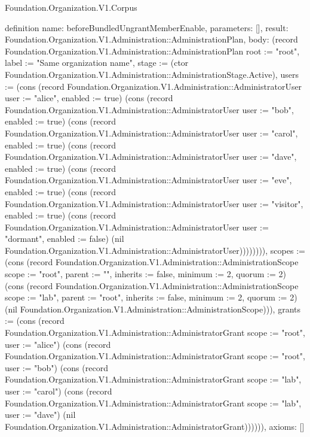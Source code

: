 \begin{lexlean}{Foundation.Organization.V1.Corpus}
\begin{semanticmodule}
definition{
  name: beforeBundledUngrantMemberEnable,
  parameters: [],
  result: Foundation.Organization.V1.Administration::AdministrationPlan,
  body: (record Foundation.Organization.V1.Administration::AdministrationPlan {root := "root", label := "Same organization name", stage := (ctor Foundation.Organization.V1.Administration::AdministrationStage.Active), users := (cons (record Foundation.Organization.V1.Administration::AdministratorUser {user := "alice", enabled := true}) (cons (record Foundation.Organization.V1.Administration::AdministratorUser {user := "bob", enabled := true}) (cons (record Foundation.Organization.V1.Administration::AdministratorUser {user := "carol", enabled := true}) (cons (record Foundation.Organization.V1.Administration::AdministratorUser {user := "dave", enabled := true}) (cons (record Foundation.Organization.V1.Administration::AdministratorUser {user := "eve", enabled := true}) (cons (record Foundation.Organization.V1.Administration::AdministratorUser {user := "visitor", enabled := true}) (cons (record Foundation.Organization.V1.Administration::AdministratorUser {user := "dormant", enabled := false}) (nil Foundation.Organization.V1.Administration::AdministratorUser)))))))), scopes := (cons (record Foundation.Organization.V1.Administration::AdministrationScope {scope := "root", parent := "", inherits := false, minimum := 2, quorum := 2}) (cons (record Foundation.Organization.V1.Administration::AdministrationScope {scope := "lab", parent := "root", inherits := false, minimum := 2, quorum := 2}) (nil Foundation.Organization.V1.Administration::AdministrationScope))), grants := (cons (record Foundation.Organization.V1.Administration::AdministratorGrant {scope := "root", user := "alice"}) (cons (record Foundation.Organization.V1.Administration::AdministratorGrant {scope := "root", user := "bob"}) (cons (record Foundation.Organization.V1.Administration::AdministratorGrant {scope := "lab", user := "carol"}) (cons (record Foundation.Organization.V1.Administration::AdministratorGrant {scope := "lab", user := "dave"}) (nil Foundation.Organization.V1.Administration::AdministratorGrant)))))}),
  axioms: []
}


\end{semanticmodule}
\end{lexlean}
